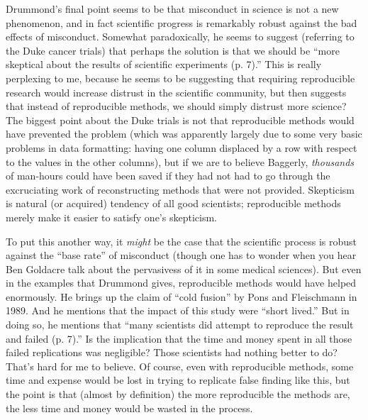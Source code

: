 \documentclass{book}
\begin{document}
Drummond's final point seems to be that misconduct in science is not a new phenomenon, and in fact scientific progress is remarkably robust against the bad effects of misconduct. Somewhat paradoxically, he seems to suggest (referring to the Duke cancer trials) that perhaps the solution is that we should be ``more skeptical about the results of scientific experiments (p. 7).'' This is really perplexing to me, because he seems to be suggesting that requiring reproducible research would increase distrust in the scientific community, but then suggests that instead of reproducible methods, we should simply distrust more science? The biggest point about the Duke trials is not that reproducible methods would have prevented the problem (which was apparently largely due to some very basic problems in data formatting: having one column displaced by a row with respect to the values in the other columns), but if we are to believe Baggerly, \emph{thousands} of man-hours could have been saved if they had not had to go through the excruciating work of reconstructing methods that were not provided. Skepticism is natural (or acquired) tendency of all good scientists; reproducible methods merely make it easier to satisfy one's skepticism.

To put this another way, it \emph{might} be the case that the scientific process is robust against the ``base rate'' of misconduct (though one has to wonder when you hear Ben Goldacre talk about the pervasivess of it in some medical sciences).  But even in the examples that Drummond gives, reproducible methods would have helped enormously. He brings up the claim of ``cold fusion'' by Pons and Fleischmann in 1989. And he mentions that the impact of this study were ``short lived.''  But in doing so, he mentions that ``many scientists did attempt to reproduce the result and failed (p. 7).'' Is the implication that the time and money spent in all those failed replications was negligible? Those scientists had nothing better to do? That's hard for me to believe. Of course, even with reproducible methods, some time and expense would be lost in trying to replicate false finding like this, but the point is that (almost by definition) the more reproducible the methods are, the less time and money would be wasted in the process.
\end{document}
